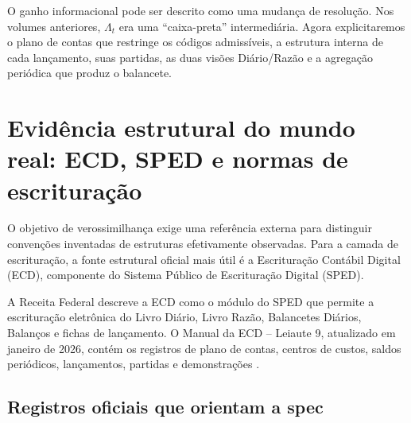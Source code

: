 \documentclass[11pt,a4paper]{article}
\begin{document}
\begin{intuicao}
O ganho informacional pode ser descrito como uma mudança de resolução. Nos volumes anteriores, $\Lambda_t$ era uma ``caixa-preta'' intermediária. Agora explicitaremos o plano de contas que restringe os códigos admissíveis, a estrutura interna de cada lançamento, suas partidas, as duas visões Diário/Razão e a agregação periódica que produz o balancete.
\end{intuicao}

\section{Evidência estrutural do mundo real: ECD, SPED e normas de escrituração}

O objetivo de verossimilhança exige uma referência externa para distinguir convenções inventadas de estruturas efetivamente observadas. Para a camada de escrituração, a fonte estrutural oficial mais útil é a Escrituração Contábil Digital (ECD), componente do Sistema Público de Escrituração Digital (SPED).

\begin{fonte}
A Receita Federal descreve a ECD como o módulo do SPED que permite a escrituração eletrônica do Livro Diário, Livro Razão, Balancetes Diários, Balanços e fichas de lançamento. O Manual da ECD -- Leiaute 9, atualizado em janeiro de 2026, contém os registros de plano de contas, centros de custos, saldos periódicos, lançamentos, partidas e demonstrações \cite{ECD_PAGE,ECD2026}.
\end{fonte}

\subsection{Registros oficiais que orientam a spec}
\end{document}
